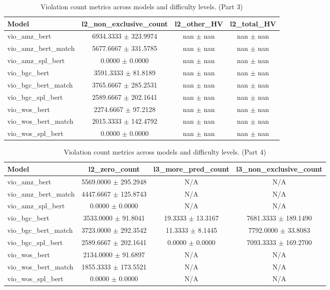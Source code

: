 \begin{table}[htbp]
\centering
\small
\begin{tabular}{lccc}
\toprule
Model & l2_non\_exclusive\_count & l2_other\_HV & l2_total\_HV \\
\midrule
vio\_amz\_bert & 6934.3333 $\pm$ 323.9974 & nan $\pm$ nan & nan $\pm$ nan \\
vio\_amz\_bert\_match & 5677.6667 $\pm$ 331.5785 & nan $\pm$ nan & nan $\pm$ nan \\
vio\_amz\_spl\_bert & 0.0000 $\pm$ 0.0000 & nan $\pm$ nan & nan $\pm$ nan \\
vio\_bgc\_bert & 3591.3333 $\pm$ 81.8189 & nan $\pm$ nan & nan $\pm$ nan \\
vio\_bgc\_bert\_match & 3765.6667 $\pm$ 285.2531 & nan $\pm$ nan & nan $\pm$ nan \\
vio\_bgc\_spl\_bert & 2589.6667 $\pm$ 202.1641 & nan $\pm$ nan & nan $\pm$ nan \\
vio\_wos\_bert & 2274.6667 $\pm$ 97.2128 & nan $\pm$ nan & nan $\pm$ nan \\
vio\_wos\_bert\_match & 2015.3333 $\pm$ 142.4792 & nan $\pm$ nan & nan $\pm$ nan \\
vio\_wos\_spl\_bert & 0.0000 $\pm$ 0.0000 & nan $\pm$ nan & nan $\pm$ nan \\
\bottomrule
\end{tabular}
\caption{Violation count metrics across models and difficulty levels. (Part 3)}
\label{tab:vio_metrics_part3}
\end{table}

\begin{table}[htbp]
\centering
\small
\begin{tabular}{lccc}
\toprule
Model & l2_zero\_count & l3_more\_pred\_count & l3_non\_exclusive\_count \\
\midrule
vio\_amz\_bert & 5569.0000 $\pm$ 295.2948 & N/A & N/A \\
vio\_amz\_bert\_match & 4447.6667 $\pm$ 125.8743 & N/A & N/A \\
vio\_amz\_spl\_bert & 0.0000 $\pm$ 0.0000 & N/A & N/A \\
vio\_bgc\_bert & 3533.0000 $\pm$ 91.8041 & 19.3333 $\pm$ 13.3167 & 7681.3333 $\pm$ 189.1490 \\
vio\_bgc\_bert\_match & 3723.0000 $\pm$ 292.3542 & 11.3333 $\pm$ 8.1445 & 7792.0000 $\pm$ 33.8083 \\
vio\_bgc\_spl\_bert & 2589.6667 $\pm$ 202.1641 & 0.0000 $\pm$ 0.0000 & 7093.3333 $\pm$ 169.2700 \\
vio\_wos\_bert & 2134.0000 $\pm$ 91.6897 & N/A & N/A \\
vio\_wos\_bert\_match & 1855.3333 $\pm$ 173.5521 & N/A & N/A \\
vio\_wos\_spl\_bert & 0.0000 $\pm$ 0.0000 & N/A & N/A \\
\bottomrule
\end{tabular}
\caption{Violation count metrics across models and difficulty levels. (Part 4)}
\label{tab:vio_metrics_part4}
\end{table}

